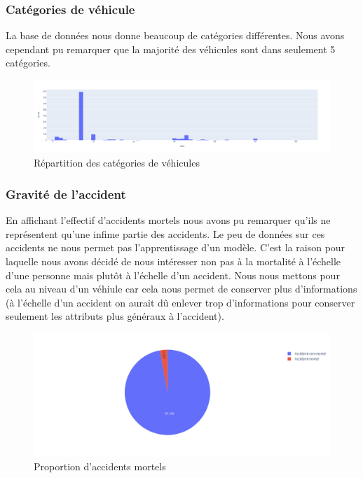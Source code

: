 \documentclass{article}
\begin{document}
    \subsubsection{Catégories de véhicule}
    La base de données nous donne beaucoup de catégories différentes. Nous avons cependant pu remarquer 
    que la majorité des véhicules sont dans seulement 5 catégories.
    \begin{figure}[ht]
        \centering
        \includegraphics[width=12cm]{./img/catv1.png}
        \caption{Répartition des catégories de véhicules}
    \end{figure}

    \subsubsection{Gravité de l'accident}
    En affichant l'effectif d'accidents mortels nous avons pu remarquer qu'ils ne représentent qu'une 
    infime partie des accidents. Le peu de données sur ces accidents ne nous permet pas l'apprentissage 
    d'un modèle. C'est la raison pour laquelle nous avons décidé de nous intéresser non pas à la mortalité 
    à l'échelle d'une personne mais plutôt à l'échelle d'un accident. Nous nous mettons pour cela au niveau d'un 
    véhiule car cela nous permet de conserver plus d'informations (à l'échelle d'un accident on aurait 
    dû enlever trop d'informations pour conserver seulement les attributs plus généraux à l'accident).

    \begin{figure}[ht]
        \centering
        \includegraphics[width=12cm]{./img/grav1.png}
        \caption{Proportion d'accidents mortels}
    \end{figure}
\end{document}
